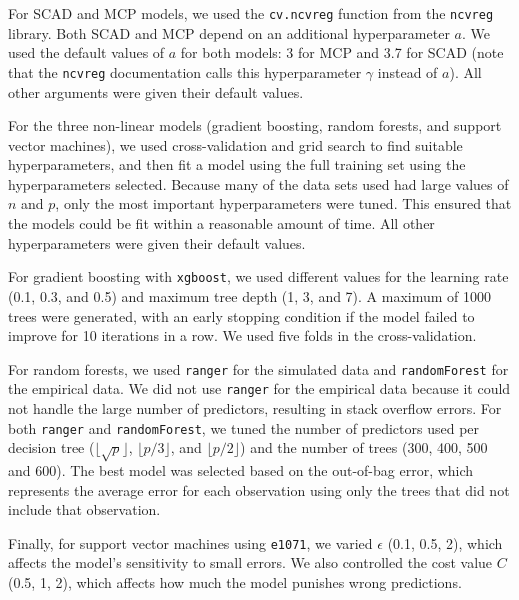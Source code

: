 \documentclass{article}
\begin{document}
For SCAD and MCP models, we used the \lstinline!cv.ncvreg! function from the \lstinline!ncvreg! library. Both SCAD and MCP depend on an additional hyperparameter $a$. We used the default values of $a$ for both models: 3 for MCP and 3.7 for SCAD (note that the \lstinline!ncvreg! documentation calls this hyperparameter $\gamma$ instead of $a$). All other arguments were given their default values. 

For the three non-linear models (gradient boosting, random forests, and support vector machines), we used cross-validation and grid search to find suitable hyperparameters, and then fit a model using the full training set using the hyperparameters selected. Because many of the data sets used had large values of $n$ and $p$, only the most important hyperparameters were tuned. This ensured that the models could be fit within a reasonable amount of time. All other hyperparameters were given their default values.

For gradient boosting with \lstinline!xgboost!, we used different values for the learning rate (0.1, 0.3, and 0.5) and maximum tree depth (1, 3, and 7). A maximum of 1000 trees were generated, with an early stopping condition if the model failed to improve for 10 iterations in a row. We used five folds in the cross-validation.

For random forests, we used \lstinline!ranger! for the simulated data and \lstinline!randomForest! for the empirical data. We did not use \lstinline!ranger! for the empirical data because it could not handle the large number of predictors, resulting in stack overflow errors. For both \lstinline!ranger! and \lstinline!randomForest!, we tuned the number of predictors used per decision tree ($\lfloor \sqrt{p}\rfloor$, $\lfloor p / 3 \rfloor$, and $\lfloor p / 2 \rfloor$) and the number of trees (300, 400, 500 and 600). The best model was selected based on the out-of-bag error, which represents the average error for each observation using only the trees that did not include that observation.

Finally, for support vector machines using \lstinline!e1071!, we varied $\epsilon$ (0.1, 0.5, 2), which affects the model's sensitivity to small errors. We also controlled the cost value $C$ (0.5, 1, 2), which affects how much the model punishes wrong predictions.
\end{document}
